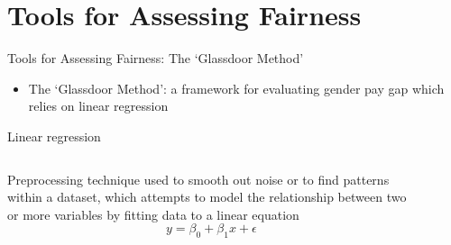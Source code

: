 \documentclass[usenames,dvipsnames]{beamer}
\begin{document}
    \section[]{Tools for Assessing Fairness}
    \begin{frame}{Tools for Assessing Fairness: The `Glassdoor Method'}
        \begin{itemize}
            \item \alert{The `Glassdoor Method'}: a framework for evaluating gender pay gap which relies on \textcolor{defaultBlue}{linear regression} \emph{\parencite{chamberlain2017analyze}}
        \end{itemize}
        \begin{block}{Linear regression}
            \begin{columns}
                \begin{column}{0.4715\textwidth}
                    Preprocessing technique used to smooth out noise or to find patterns within a dataset, which attempts to model the relationship between two or more variables by fitting data to a linear equation \[y = \beta_0 + \beta_1x + \epsilon\]
                \end{column}
                \begin{column}{0.4715\textwidth}
                    \begin{center}
                        \begin{figure}
                        \end{figure}
                    \end{center}
                \end{column}
            \end{columns}
        \end{block}
    \end{frame}
    
\end{document}
